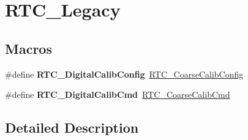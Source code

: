 \hypertarget{group___r_t_c___legacy}{\section{R\-T\-C\-\_\-\-Legacy}
\label{group___r_t_c___legacy}
}
\subsection*{Macros}
\begin{DoxyCompactItemize}
\item 
\hypertarget{group___r_t_c___legacy_ga6fd6ce83a6c888a7613e641d4478c0cc}{\#define {\bfseries R\-T\-C\-\_\-\-Digital\-Calib\-Config}~\hyperlink{group___r_t_c___group7_gaa3bb10170a2c70ac9ce3e41c611bdd43}{R\-T\-C\-\_\-\-Coarse\-Calib\-Config}}\label{group___r_t_c___legacy_ga6fd6ce83a6c888a7613e641d4478c0cc}

\item 
\hypertarget{group___r_t_c___legacy_ga8a04a24beeae55e24cf8d2f3dbb5ead5}{\#define {\bfseries R\-T\-C\-\_\-\-Digital\-Calib\-Cmd}~\hyperlink{group___r_t_c___group7_ga008ae7173b2befe876f5e76686bc9089}{R\-T\-C\-\_\-\-Coarse\-Calib\-Cmd}}\label{group___r_t_c___legacy_ga8a04a24beeae55e24cf8d2f3dbb5ead5}

\end{DoxyCompactItemize}


\subsection{Detailed Description}
